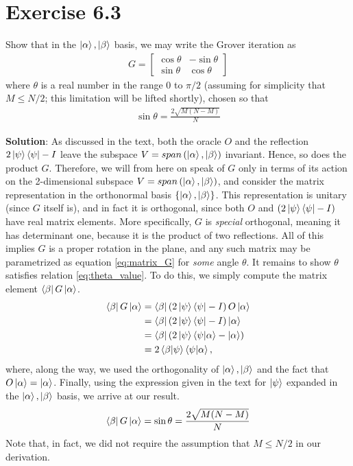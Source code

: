 \documentclass{book}
\begin{document}
\section*{Exercise 6.3}
    Show that in the $\ket{\alpha}, \ket{\beta}$ basis, we may write the Grover iteration as
    \begin{align}
        G = 
        \begin{bmatrix} \label{eq:matrix_G}
            \cos\theta & -\sin\theta \\
            \sin\theta & \cos\theta
        \end{bmatrix}
    \end{align}
    where $\theta$ is a real number in the range 0 to $\pi/2$ (assuming for simplicity that $M\leq N/2$; this limitation will be lifted shortly), chosen so that
    \begin{align} \label{eq:theta_value}
        \sin\theta =\frac{2\sqrt{M(N-M)}}{N}
    \end{align}
    
    \textbf{Solution}: As discussed in the text, both the oracle $O$ and the reflection $2\ket{\psi}\bra{\psi}-I$ leave the subspace $V = span\left(\ket{\alpha},\ket{\beta}\right)$ invariant. Hence, so does the product $G$. Therefore, we will from here on speak of $G$ only in terms of its action on the 2-dimensional subspace $V = span\left(\ket{\alpha},\ket{\beta}\right)$, and consider the matrix representation in the orthonormal basis $\{\ket{\alpha},\ket{\beta}\}$. This representation is unitary (since $G$ itself is), and in fact it is orthogonal, since both $O$ and $(2\ket{\psi}\bra{\psi}-I)$ have real matrix elements. More specifically, $G$ is \emph{special} orthogonal, meaning it has determinant one, because it is the product of two reflections. All of this implies $G$ is a proper rotation in the plane, and any such matrix may be parametrized as equation \eqref{eq:matrix_G} for \emph{some} angle $\theta$. It remains to show $\theta$ satisfies relation \eqref{eq:theta_value}. To do this, we simply compute the matrix element $\bra{\beta}G\ket{\alpha}$.
    \begin{align}
    \begin{aligned}
        \bra{\beta}G\ket{\alpha} &= \bra{\beta}\left(2\ket{\psi}\bra{\psi}-I\right)O\ket{\alpha} \\
        &=\bra{\beta}\left(2\ket{\psi}\bra{\psi}-I\right)\ket{\alpha}\\
        &=\bra{\beta}\left(2\ket{\psi}\braket{\psi}{\alpha}-\ket{\alpha}\right) \\
        &=2\braket{\beta}{\psi}\braket{\psi}{\alpha},
    \end{aligned}
    \end{align}
    where, along the way, we used the orthogonality of $\ket{\alpha},\ket{\beta}$ and the fact that $O\ket{\alpha} = \ket{\alpha}$. Finally, using the expression given in the text for $\ket{\psi}$ expanded in the $\ket{\alpha},\ket{\beta}$ basis, we arrive at our result. 
    \begin{align}
        \bra{\beta}G\ket{\alpha} = \sin\theta = \frac{2\sqrt{M(N-M)}}{N}
    \end{align}
    Note that, in fact, we did not require the assumption that $M\leq N/2$ in our derivation.
\end{document}

